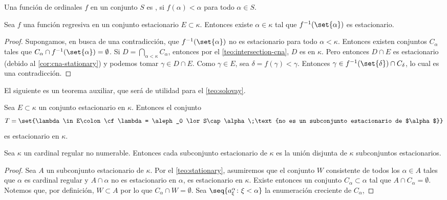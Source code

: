 \begin{defi}
    Una función de ordinales $f$ en un conjunto $S$ es , si
    $f(\alpha)<\alpha$ para todo $\alpha\in S$.
\end{defi}

\begin{teo}[Fodor]\label{teo:fodor}
    Sea $f$ una función regresiva en un conjunto estacionario $E\subset\kappa$.
    Entonces existe $\alpha\in\kappa$ tal que $f^{-1}(\set{\alpha})$ es estacionario.
\end{teo}

\begin{proof}
    Supongamos, en busca de una contradicción, que $f^{-1}(\set{\alpha})$ no es estacionario
    para todo $\alpha<\kappa$. Entonces existen conjuntos \cna{} $C_\alpha$ tales que
    $C_\alpha\cap f^{-1}(\set{\alpha}) = \emptyset$. Si $D=\dint_{\alpha<\kappa} C_\alpha$,
    entonces por el \cref{teo:intersection-cna}, $D$ es \cna{} en $\kappa$.
    Pero entonces $D\cap E$ es estacionario (debido al \cref{cor:cna-stationary})
    y podemos tomar $\gamma\in D\cap E$.
    Como $\gamma\in E$, sea $\delta=f(\gamma)<\gamma$.
    Entonces $\gamma\in f^{-1}(\set{\delta})\cap C_\delta$, lo cual es una contradicción.
\end{proof}

El siguiente es un teorema auxiliar, que será de utilidad para el \cref{teo:solovay}.

\begin{teo}\label{teo:stationary}
    Sea $E\subset\kappa$ un conjunto estacionario en $\kappa$. Entonces el conjunto
    \[
        T=\set{\lambda\in E\colon
            \cf\lambda = \aleph_0 \lor
            S\cap\alpha\;\text{no es un subconjunto estacionario de $\alpha$}}
    \]
    es estacionario en $\kappa$.
\end{teo}

\begin{teo}[Solovay]\label{teo:solovay}
    Sea $\kappa$ un cardinal regular no numerable. Entonces cada subconjunto estacionario
    de $\kappa$ es la unión disjunta de $\kappa$ subconjuntos estacionarios.
\end{teo}

\begin{proof}
    Sea $A$ un subconjunto estacionario de $\kappa$.
    Por el \cref{teo:stationary}, asumiremos que el conjunto $W$
    consistente de todos los $\alpha\in A$ tales que $\alpha$ es cardinal
    regular y $A\cap\alpha$ no es estacionario en $\alpha$, es estacionario en $\kappa$.
    Existe entonces un conjunto \cna{} $C_\alpha\subset\alpha$ tal que $A\cap C_\alpha = \emptyset$.
    Notemos que, por definición, $W\subset A$ por lo que $C_\alpha\cap W=\emptyset$.
    Sea $\seq{a_\xi^\alpha\colon\xi<\alpha}$ la enumeración creciente de $C_\alpha$,
\end{proof}

